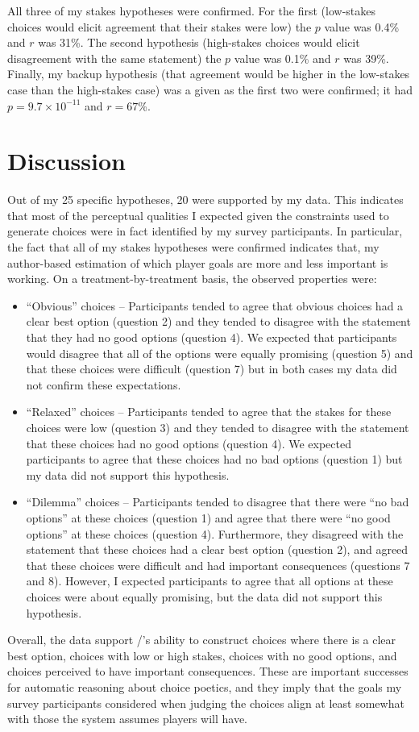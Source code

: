 All three of my stakes hypotheses were confirmed.
%
For the first (low-stakes choices would elicit agreement that their stakes were low) the $p$ value was 0.4\% and $r$ was 31\%.
%
The second hypothesis (high-stakes choices would elicit disagreement with the same statement) the $p$ value was 0.1\% and $r$ was 39\%.
%
Finally, my backup hypothesis (that agreement would be higher in the low-stakes case than the high-stakes case) was a given as the first two were confirmed; it had $p = 9.7\times10^{-11}$ and $r = 67$\%.

\section{Discussion}

Out of my 25 specific hypotheses, 20 were supported by my data.
%
This indicates that most of the perceptual qualities I expected given the constraints used to generate choices were in fact identified by my survey participants.
%
In particular, the fact that all of my stakes hypotheses were confirmed indicates that, my author-based estimation of which player goals are more and less important is working.
%
On a treatment-by-treatment basis, the observed properties were:
%
\begin{itemize}
  \item ``Obvious'' choices -- Participants tended to agree that obvious choices had a clear best option (question 2) and they tended to disagree with the statement that they had no good options (question 4). We expected that participants would disagree that all of the options were equally promising (question 5) and that these choices were difficult (question 7) but in both cases my data did not confirm these expectations.
  \item ``Relaxed'' choices -- Participants tended to agree that the stakes for these choices were low (question 3) and they tended to disagree with the statement that these choices had no good options (question 4). We expected participants to agree that these choices had no bad options (question 1) but my data did not support this hypothesis.
  \item ``Dilemma'' choices -- Participants tended to disagree that there were ``no bad options'' at these choices (question 1) and agree that there were ``no good options'' at these choices (question 4). Furthermore, they disagreed with the statement that these choices had a clear best option (question 2), and agreed that these choices were difficult and had important consequences (questions 7 and 8). However, I expected participants to agree that all options at these choices were about equally promising, but the data did not support this hypothesis.
\end{itemize}
%
Overall, the data support \dunyazad/'s ability to construct choices where there is a clear best option, choices with low or high stakes, choices with no good options, and choices perceived to have important consequences.
%
These are important successes for automatic reasoning about choice poetics, and they imply that the goals my survey participants considered when judging the choices align at least somewhat with those the system assumes players will have.


